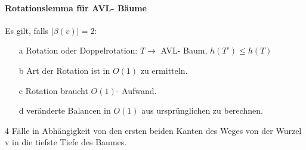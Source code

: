 \documentclass[fleqn]{scrartcl}
\begin{document}
\newpage
\paragraph{Rotationslemma für AVL- Bäume}
Es gilt, falls $|\beta(v)| = 2$:
\begin{itemize}
\item[a] Rotation oder Doppelrotation: $T \rightarrow$ AVL- Baum, $h(T') \leq h(T)$
\item[b] Art der Rotation ist in $O(1)$ zu ermitteln.
\item[c] Rotation braucht $O(1)$- Aufwand.
\item[d] veränderte Balancen in $O(1)$ aus ursprünglichen zu berechnen.
\end{itemize}
4 Fälle in Abhängigkeit von den ersten beiden Kanten des Weges von der Wurzel v in die tiefste Tiefe des Baumes.
\end{document}
